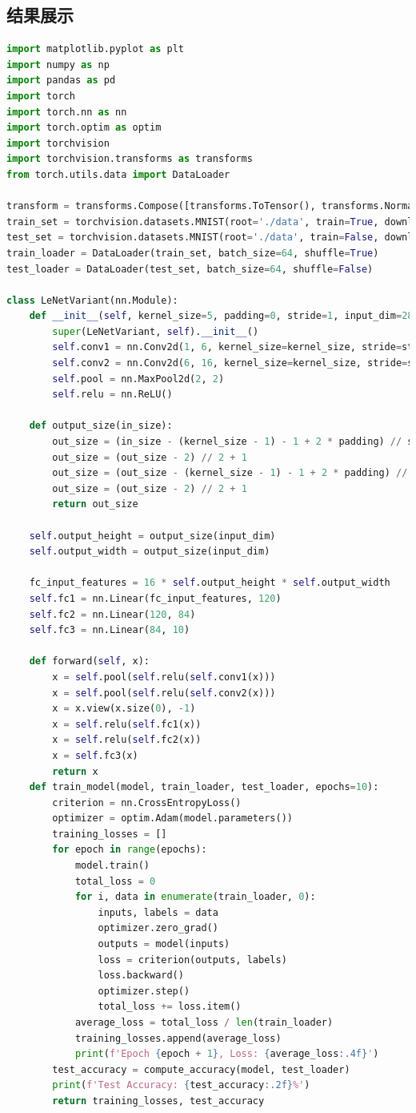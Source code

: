 \documentclass[a4paper,12pt]{article}
\begin{document}
\subsection{结果展示}
\begin{lstlisting}[language=Python]
import matplotlib.pyplot as plt
import numpy as np
import pandas as pd
import torch
import torch.nn as nn
import torch.optim as optim
import torchvision
import torchvision.transforms as transforms
from torch.utils.data import DataLoader

transform = transforms.Compose([transforms.ToTensor(), transforms.Normalize((0.5,), (0.5,))])
train_set = torchvision.datasets.MNIST(root='./data', train=True, download=True, transform=transform)
test_set = torchvision.datasets.MNIST(root='./data', train=False, download=True, transform=transform)
train_loader = DataLoader(train_set, batch_size=64, shuffle=True)
test_loader = DataLoader(test_set, batch_size=64, shuffle=False)

class LeNetVariant(nn.Module):
	def __init__(self, kernel_size=5, padding=0, stride=1, input_dim=28):
		super(LeNetVariant, self).__init__()
		self.conv1 = nn.Conv2d(1, 6, kernel_size=kernel_size, stride=stride, padding=padding)
		self.conv2 = nn.Conv2d(6, 16, kernel_size=kernel_size, stride=stride, padding=padding)
		self.pool = nn.MaxPool2d(2, 2)
		self.relu = nn.ReLU()

	def output_size(in_size):
		out_size = (in_size - (kernel_size - 1) - 1 + 2 * padding) // stride + 1
		out_size = (out_size - 2) // 2 + 1
		out_size = (out_size - (kernel_size - 1) - 1 + 2 * padding) // stride + 1
		out_size = (out_size - 2) // 2 + 1
		return out_size

	self.output_height = output_size(input_dim)
	self.output_width = output_size(input_dim)

	fc_input_features = 16 * self.output_height * self.output_width
	self.fc1 = nn.Linear(fc_input_features, 120)
	self.fc2 = nn.Linear(120, 84)
	self.fc3 = nn.Linear(84, 10)

	def forward(self, x):
		x = self.pool(self.relu(self.conv1(x)))
		x = self.pool(self.relu(self.conv2(x)))
		x = x.view(x.size(0), -1)
		x = self.relu(self.fc1(x))
		x = self.relu(self.fc2(x))
		x = self.fc3(x)
		return x
	def train_model(model, train_loader, test_loader, epochs=10):
		criterion = nn.CrossEntropyLoss()
		optimizer = optim.Adam(model.parameters())
		training_losses = []
		for epoch in range(epochs):
			model.train()
			total_loss = 0
			for i, data in enumerate(train_loader, 0):
				inputs, labels = data
				optimizer.zero_grad()
				outputs = model(inputs)
				loss = criterion(outputs, labels)
				loss.backward()
				optimizer.step()
				total_loss += loss.item()
			average_loss = total_loss / len(train_loader)
			training_losses.append(average_loss)
			print(f'Epoch {epoch + 1}, Loss: {average_loss:.4f}')
		test_accuracy = compute_accuracy(model, test_loader)
		print(f'Test Accuracy: {test_accuracy:.2f}%')
		return training_losses, test_accuracy


\end{lstlisting}
\end{document}
